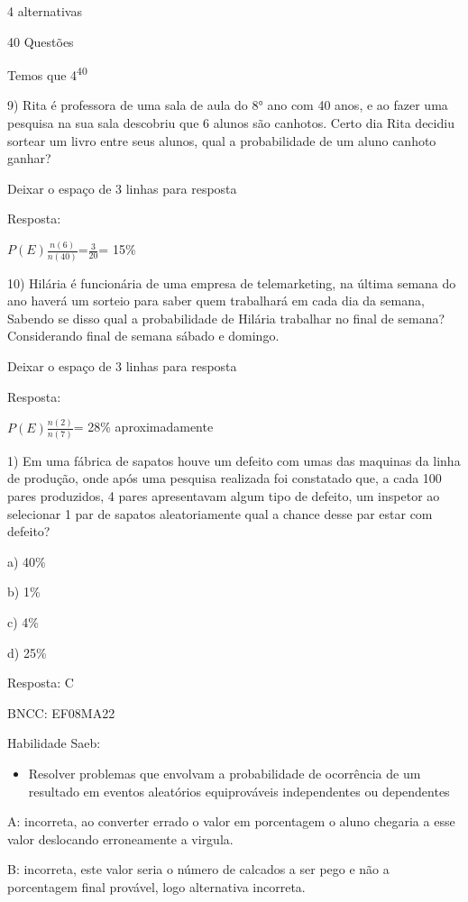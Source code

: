 4 alternativas

40 Questões

Temos que 4\textsuperscript{40}

9) Rita é professora de uma sala de aula do 8° ano com 40 anos, e ao
fazer uma pesquisa na sua sala descobriu que 6 alunos são canhotos.
Certo dia Rita decidiu sortear um livro entre seus alunos, qual a
probabilidade de um aluno canhoto ganhar?

Deixar o espaço de 3 linhas para resposta

Resposta:

\(P(E)\frac{n(6)}{n(40)}\)=\(\frac{3}{20}\)= 15\%

10) Hilária é funcionária de uma empresa de telemarketing, na última
semana do ano haverá um sorteio para saber quem trabalhará em cada dia
da semana, Sabendo se disso qual a probabilidade de Hilária trabalhar no
final de semana? Considerando final de semana sábado e domingo.

Deixar o espaço de 3 linhas para resposta

Resposta:

\(P(E)\frac{n(2)}{n(7)}\)= 28\% aproximadamente


1) Em uma fábrica de sapatos houve um defeito com umas das maquinas da
linha de produção, onde após uma pesquisa realizada foi constatado que,
a cada 100 pares produzidos, 4 pares apresentavam algum tipo de defeito,
um inspetor ao selecionar 1 par de sapatos aleatoriamente qual a chance
desse par estar com defeito?

a) 40\%

b) 1\%

c) 4\%

d) 25\%

Resposta: C

BNCC: EF08MA22

Habilidade Saeb:

\begin{itemize}
\tightlist
\item
  Resolver problemas que envolvam a probabilidade de ocorrência de um
  resultado em eventos aleatórios equiprováveis independentes ou
  dependentes
\end{itemize}

A: incorreta, ao converter errado o valor em porcentagem o aluno
chegaria a esse valor deslocando erroneamente a virgula.

B: incorreta, este valor seria o número de calcados a ser pego e não a
porcentagem final provável, logo alternativa incorreta.

